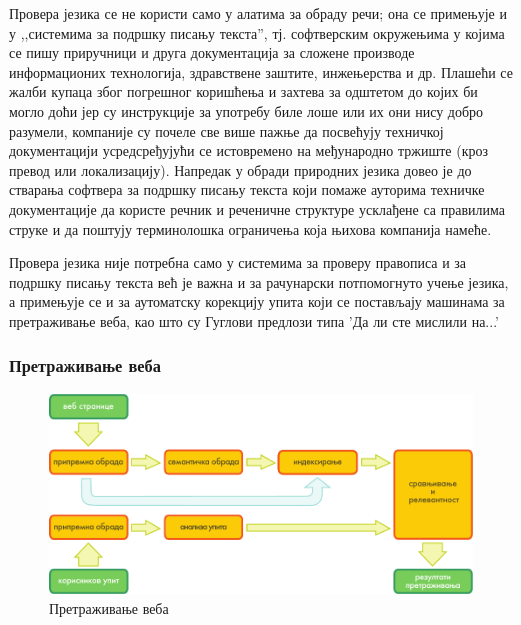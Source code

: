 \begin{multicols}{2}
Провера језика се не користи само у алатима за обраду речи; она се примењује и у ,,системима за подршку писању текста'', тј. софтверским окружењима у којима се пишу приручници и друга документација за сложене производе информационих технологија, здравствене заштите, инжењерства и др. Плашећи се жалби купаца због погрешног коришћења и захтева за одштетом до којих би могло доћи јер су инструкције за употребу биле лоше или их они нису добро разумели, компаније су почеле све више пажње да посвећују техничкој документацији усредсређујући се истовремено на међународно тржиште (кроз превод или локализацију). Напредак у обради природних језика довео је до стварања софтвера за подршку писању текста који помаже ауторима техничке документације да користе речник и реченичне структуре усклађене са правилима струке и да поштују терминолошка ограничења која њихова компанија намеће. 

Провера језика није потребна само у системима за проверу правописа и за подршку писању текста већ је важна и за рачунарски потпомогнуто учење језика, а примењује се и  за аутоматску корекцију упита који се постављају машинама за претраживање веба, као што су Гуглови предлози типа 'Да ли сте мислили на...' 
 
 \subsubsection {Претраживање веба}


\begin{figure}[htb]
  \center
  \includegraphics[width=\textwidth]{../_media/serbian/web_search_architecture}
  \caption{Претраживање веба}
  \label{fig:websearcharch_sr}
\end{figure}


\end{multicols}
